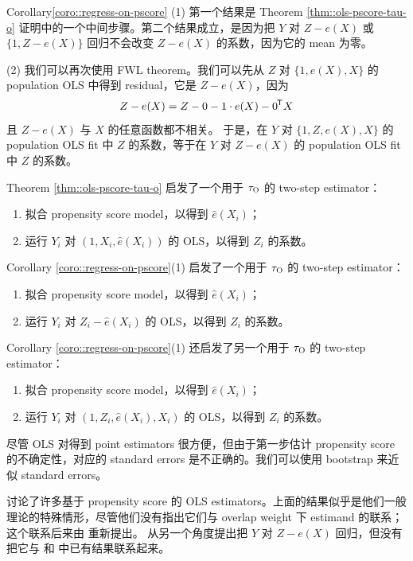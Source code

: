  
 
\begin{myproof}{Corollary}{\ref{coro::regress-on-pscore}}
(1) 第一个结果是 Theorem \ref{thm::ols-pscore-tau-o} 证明中的一个中间步骤。第二个结果成立，是因为把 $Y$ 对 $Z-e(X)$ 或 $\{1, Z-e(X) \}$ 回归不会改变 $Z-e(X) $ 的系数，因为它的 mean 为零。


(2) 我们可以再次使用 FWL theorem。我们可以先从 $Z$ 对 $\{1, e(X), X\}$ 的 population OLS 中得到 residual，它是 $Z-e(X) $，因为
$$
Z-e(X) = Z-0 - 1\cdot e(X) - 0^{\mkern-1.5mu\mathsf{T}} X $$ 
且 $Z-e(X)$ 与 $X$ 的任意函数都不相关。
于是，在 $Y$ 对 $\{1, Z, e(X), X\}$ 的 population OLS fit 中 $Z$ 的系数，等于在 $Y$ 对 $Z-e(X)$ 的 population OLS fit 中 $Z$ 的系数。
  \end{myproof}
  
  
  
  Theorem \ref{thm::ols-pscore-tau-o} 启发了一个用于 $\tau_\textsc{O} $ 的 two-step estimator：
\begin{enumerate}
\item
拟合 propensity score model，以得到 $\hat e(X_i) $；
\item
运行 $Y_i$ 对 $(1,X_i, \hat e(X_i) )$ 的 OLS，以得到 $Z_i$ 的系数。
\end{enumerate}  
Corollary \ref{coro::regress-on-pscore}(1) 启发了一个用于 $\tau_\textsc{O} $ 的 two-step estimator：
\begin{enumerate}
\item
拟合 propensity score model，以得到 $\hat e(X_i) $；
\item
运行 $Y_i$ 对 $Z_i - \hat e(X_i)$ 的 OLS，以得到 $Z_i$ 的系数。
\end{enumerate}
Corollary \ref{coro::regress-on-pscore}(1) 还启发了另一个用于 $\tau_\textsc{O} $ 的 two-step estimator：
\begin{enumerate}
\item
拟合 propensity score model，以得到 $\hat e(X_i) $；
\item
运行 $Y_i$ 对 $(1, Z_i , \hat e(X_i),  X_i ) $ 的 OLS，以得到 $Z_i$ 的系数。
\end{enumerate}
尽管 OLS 对得到 point estimators 很方便，但由于第一步估计 propensity score 的不确定性，对应的 standard errors 是不正确的。我们可以使用 bootstrap 来近似 standard errors。
  

  
  
 
 
\citet{robins1992estimating} 讨论了许多基于 propensity score 的 OLS estimators。上面的结果似乎是他们一般理论的特殊情形，尽管他们没有指出它们与 overlap weight 下 estimand 的联系；这个联系后来由 \citet{li2018balancing} 重新提出。\citet{lee2018simple} 从另一个角度提出把 $Y$ 对 $Z-e(X)$ 回归，但没有把它与 \citet{robins1992estimating} 和 \citet{li2018balancing} 中已有结果联系起来。



